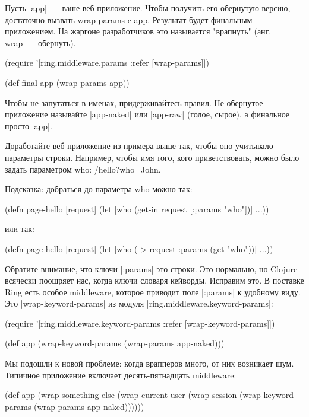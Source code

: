Пусть \spverb|app|~--- ваше веб-приложение. Чтобы получить его обернутую версию,
достаточно вызвать wrap-params c app. Результат будет финальным приложением. На
жаргоне разработчиков это называется "врапнуть" (анг. wrap~--- обернуть).

\begin{code}
(require '[ring.middleware.params
           :refer [wrap-params]])

(def final-app
  (wrap-params app))
\end{code}

Чтобы не запутаться в именах, придерживайтесь правил. Не обернутое приложение
называйте \spverb|app-naked| или \spverb|app-raw| (голое, сырое), а финальное просто \spverb|app|.

Доработайте веб-приложение из примера выше так, чтобы оно учитывало параметры
строки. Например, чтобы имя того, кого приветствовать, можно было задать
параметром who: /hello?who=John.

Подсказка: добраться до параметра who можно так:

\begin{code}
(defn page-hello
  [request]
  (let [who (get-in request [:params "who"])]
    ...))
\end{code}

или так:

\begin{code}
(defn page-hello
  [request]
  (let [who (-> request :params (get "who"))]
    ...))
\end{code}

Обратите внимание, что ключи \spverb|:params| это строки. Это нормально, но Clojure
всячески поощряет нас, когда ключи словаря кейворды. Исправим это. В поставке
Ring есть особое middleware, которое приводит поле \spverb|:params| к удобному
виду. Это \spverb|wrap-keyword-params| из модуля \spverb|ring.middleware.keyword-params|:

\begin{code}
(require '[ring.middleware.keyword-params
           :refer [wrap-keyword-params]])

(def app
  (wrap-keyword-params (wrap-params app-naked)))
\end{code}

Мы подошли к новой проблеме: когда врапперов много, от них возникает
шум. Типичное приложение включает десять-пятнадцать middleware:

\begin{code}
(def app
  (wrap-something-else
    (wrap-current-user
      (wrap-session
        (wrap-keyword-params
          (wrap-params app-naked))))))
\end{code}

